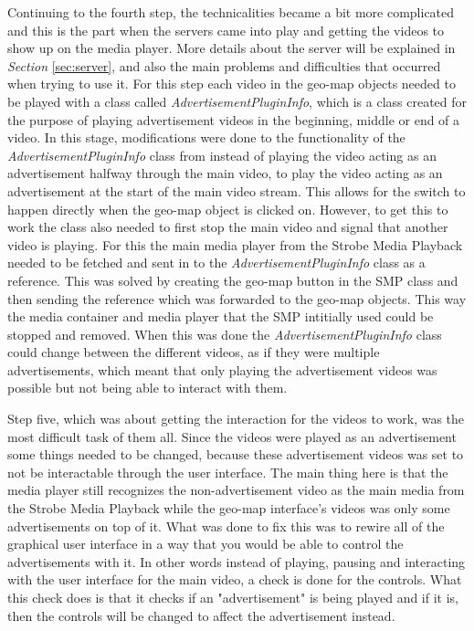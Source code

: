 Continuing to the fourth step, the technicalities became a bit more complicated and this is the part when the servers came into play and getting the videos to show up on the media player. More details about the server will be explained in \textit{Section} \ref{sec:server}, and also the main problems and difficulties that occurred when trying to use it. For this step each video in the geo-map objects needed to be played with a class called \textit{AdvertisementPluginInfo}, which is a class created for the purpose of playing advertisement videos in the beginning, middle or end of a video. In this stage, modifications were done to the functionality of the \textit{AdvertisementPluginInfo} class from instead of playing the video acting as an advertisement halfway through the main video, to play the video acting as an advertisement at the start of the main video stream. This allows for the switch to happen directly when the geo-map object is clicked on. However, to get this to work the class also needed to first stop the main video and signal that another video is playing. For this the main media player from the Strobe Media Playback needed to be fetched and sent in to the \textit{AdvertisementPluginInfo} class as a reference. This was solved by creating the geo-map button in the SMP class and then sending the reference which was forwarded to the geo-map objects. This way the media container and media player that the SMP intitially used could be stopped and removed. When this was done the \textit{AdvertisementPluginInfo} class could change between the different videos, as if they were multiple advertisements, which meant that only playing the advertisement videos was possible but not being able to interact with them. 

Step five, which was about getting the interaction for the videos to work, was the most difficult task of them all. Since the videos were played as an advertisement some things needed to be changed, because these advertisement videos was set to not be interactable through the user interface. The main thing here is that the media player still recognizes the non-advertisement video as the main media from the Strobe Media Playback while the geo-map interface's videos was only some advertisements on top of it. What was done to fix this was to rewire all of the graphical user interface in a way that you would be able to control the advertisements with it. In other words instead of playing, pausing and interacting with the user interface for the main video, a check is done for the controls. What this check does is that it checks if an "advertisement" is being played and if it is, then the controls will be changed to affect the advertisement instead.

